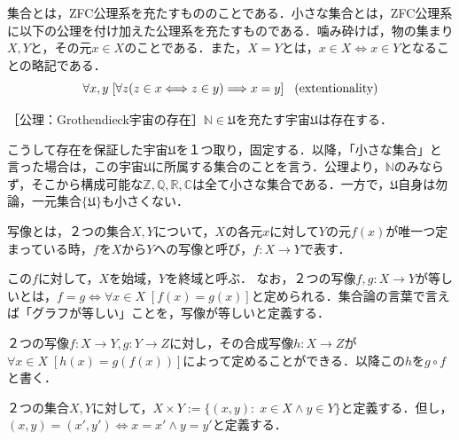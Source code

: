 \documentclass[uplatex, 12pt, a4paper, dvipdfmx]{jsarticle}
\begin{document}
\begin{shadebox}\begin{definition}[（小さな）集合]集合とは，ZFC公理系を充たすもののことである．小さな集合とは，ZFC公理系に以下の公理を付け加えた公理系を充たすものである．噛み砕けば，物の集まり$X,Y$と，その元$x\in X$のことである．また，$X=Y$とは，$x\in X \Longleftrightarrow x \in Y$となることの略記である．$$\forall x,y \; [ \forall z (z\in x \Longleftrightarrow z\in y) \Longrightarrow x=y ] \hspace{3mm}\mathrm{(extentionality)}$$
\begin{center}［公理：\rm{Grothendieck宇宙の存在}］$\mathbb{N}\in\mathfrak{U}$を充たす宇宙$\mathfrak{U}$は存在する．\end{center} \vspace{1mm}
\end{definition}\end{shadebox}
こうして存在を保証した宇宙$\mathfrak{U}$を１つ取り，固定する．以降，「小さな集合」と言った場合は，この宇宙$\mathfrak{U}$に所属する集合のことを言う．公理より，$\mathbb{N}$のみならず，そこから構成可能な$\mathbb{Z,Q,R,C}$は全て小さな集合である．一方で，$\mathfrak{U}$自身は勿論，一元集合$\{ \mathfrak{U} \}$も小さくない．
\begin{shadebox}\begin{definition}[写像]写像とは，２つの集合$X,Y$について，$X$の各元$x$に対して$Y$の元$f(x)$が唯一つ定まっている時，$f$を$X$から$Y$への写像と呼び，$f:X\longrightarrow Y$で表す．\end{definition}\end{shadebox}
この$f$に対して，$X$を始域，$Y$を終域と呼ぶ．
なお，２つの写像$f,g:X\longrightarrow Y$が等しいとは，$f=g\Longleftrightarrow \forall x \in X \; [f(x)=g(x)]$と定められる．集合論の言葉で言えば「グラフが等しい」ことを，写像が等しいと定義する．
\begin{shadebox}\begin{definition}[写像の合成]２つの写像$f:X\longrightarrow Y, g:Y\longrightarrow Z$に対し，その合成写像$h:X\longrightarrow Z$が$\forall x \in X \; [h(x)=g(f(x))]$によって定めることができる．以降この$h$を$g\circ f$と書く．\end{definition}\end{shadebox}
\begin{shadebox}\begin{definition}[集合の積]２つの集合$X,Y$に対して，$X\times Y:=\{ (x,y) :\; x\in X \wedge y\in Y\}$と定義する．但し，$(x,y)=(x',y')\Longleftrightarrow x=x'\wedge y=y'$と定義する． \end{definition}\end{shadebox}
\end{document}
